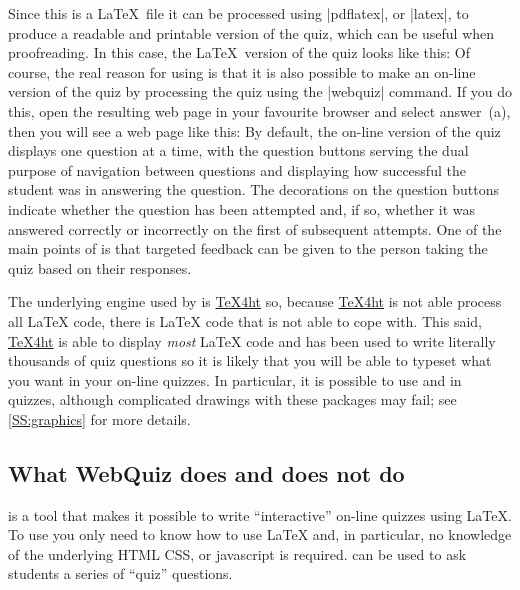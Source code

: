 \documentclass[svgnames]{article}
\newcommand\TeXfht{\href{https://www.ctan.org/tex4ht}{TeX4ht}\xspace}
\begin{document}
    Since this is a \LaTeX\ file it can be processed using
    \BashCode|pdflatex|, or \BashCode|latex|, to produce a readable and
    printable version of the quiz, which can be useful when
    proofreading. In this case, the \LaTeX\ version of the quiz looks
    like this:
    Of course, the real reason for using \WebQuiz is that it is also
    possible to make an on-line version of the quiz by processing the
    quiz using the \BashCode|webquiz| command. If you do this, open
    the resulting web page in your favourite browser and select answer~(a),
    then you will see a web page like this:
    By default, the on-line version of the quiz displays one question at a time,
    with the question buttons serving the dual purpose of navigation
    between questions and displaying how successful the student was
    in answering the question. The decorations on the question
    buttons indicate whether the question has been attempted and, if so,
    whether it was answered correctly or incorrectly on the first of
    subsequent attempts. One of the main points of \WebQuiz is that
    targeted feedback can be given to the person taking the quiz based
    on their responses.

    The underlying engine used by \WebQuiz is \TeXfht so, because
    \TeXfht is not able process all \LaTeX{} code, there is \LaTeX{}
    code that \WebQuiz is not able to cope with.  This said, \TeXfht is
    able to display \textit{most} \LaTeX{} code and \WebQuiz has been
    used to write literally thousands of quiz questions so it is likely
    that you will be able to typeset what you want in your on-line
    quizzes.  In particular, it is possible to use  and
     in \WebQuiz quizzes, although complicated
    drawings with these packages may fail; see \autoref{SS:graphics} for
    more details.

    \newpage
\subsection{What WebQuiz does and does not do}

    \WebQuiz is a tool that makes it possible to write ``interactive''
    on-line quizzes using \LaTeX{}. To use \WebQuiz you only need to
    know how to use \LaTeX{} and, in particular, no knowledge of the
    underlying HTML CSS, or javascript is required. \WebQuiz can be used
    to ask students a series of ``quiz'' questions.
\end{document}
